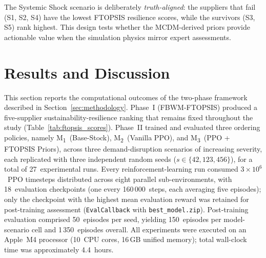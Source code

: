 \documentclass[preprint,12pt]{elsarticle}
\begin{document}
The Systemic Shock scenario is deliberately \emph{truth-aligned}: the suppliers that fail (S1, S2, S4) have the lowest FTOPSIS resilience scores, while the survivors (S3, S5) rank highest. This design tests whether the MCDM-derived priors provide actionable value when the simulation physics mirror expert assessments.


\section{Results and Discussion}
\label{sec:results}

This section reports the computational outcomes of the two-phase framework described in Section~\ref{sec:methodology}.
Phase~I (FBWM-FTOPSIS) produced a five-supplier sustainability-resilience ranking that remains fixed throughout the study (Table~\ref{tab:ftopsis_scores}).
Phase~II trained and evaluated three ordering policies, namely M\textsubscript{1}~(Base-Stock), M\textsubscript{2}~(Vanilla PPO), and M\textsubscript{3}~(PPO + FTOPSIS Priors), across three demand-disruption scenarios of increasing severity, each replicated with three independent random seeds ($s \in \{42, 123, 456\}$), for a total of 27~experimental runs.
Every reinforcement-learning run consumed $3\!\times\!10^{6}$~PPO timesteps distributed across eight parallel sub-environments, with 18~evaluation checkpoints (one every 160\,000~steps, each averaging five episodes); only the checkpoint with the highest mean evaluation reward was retained for post-training assessment (\texttt{EvalCallback} with \texttt{best\_model.zip}).
Post-training evaluation comprised 50~episodes per seed, yielding 150~episodes per model-scenario cell and 1\,350~episodes overall.
All experiments were executed on an Apple~M4 processor (10~CPU cores, 16\,GB unified memory); total wall-clock time was approximately 4.4~hours.
\end{document}
